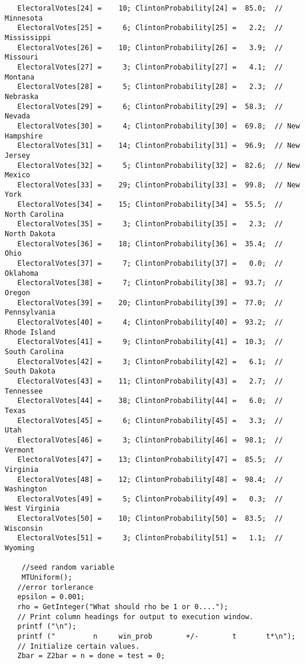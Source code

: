 \documentclass{report}
\begin{document}
\begin{lstlisting}
   ElectoralVotes[24] =    10; ClintonProbability[24] =  85.0;  // Minnesota
   ElectoralVotes[25] =     6; ClintonProbability[25] =   2.2;  // Mississippi
   ElectoralVotes[26] =    10; ClintonProbability[26] =   3.9;  // Missouri
   ElectoralVotes[27] =     3; ClintonProbability[27] =   4.1;  // Montana
   ElectoralVotes[28] =     5; ClintonProbability[28] =   2.3;  // Nebraska
   ElectoralVotes[29] =     6; ClintonProbability[29] =  58.3;  // Nevada
   ElectoralVotes[30] =     4; ClintonProbability[30] =  69.8;  // New Hampshire
   ElectoralVotes[31] =    14; ClintonProbability[31] =  96.9;  // New Jersey
   ElectoralVotes[32] =     5; ClintonProbability[32] =  82.6;  // New Mexico
   ElectoralVotes[33] =    29; ClintonProbability[33] =  99.8;  // New York
   ElectoralVotes[34] =    15; ClintonProbability[34] =  55.5;  // North Carolina
   ElectoralVotes[35] =     3; ClintonProbability[35] =   2.3;  // North Dakota
   ElectoralVotes[36] =    18; ClintonProbability[36] =  35.4;  // Ohio
   ElectoralVotes[37] =     7; ClintonProbability[37] =   0.0;  // Oklahoma
   ElectoralVotes[38] =     7; ClintonProbability[38] =  93.7;  // Oregon
   ElectoralVotes[39] =    20; ClintonProbability[39] =  77.0;  // Pennsylvania
   ElectoralVotes[40] =     4; ClintonProbability[40] =  93.2;  // Rhode Island
   ElectoralVotes[41] =     9; ClintonProbability[41] =  10.3;  // South Carolina
   ElectoralVotes[42] =     3; ClintonProbability[42] =   6.1;  // South Dakota
   ElectoralVotes[43] =    11; ClintonProbability[43] =   2.7;  // Tennessee
   ElectoralVotes[44] =    38; ClintonProbability[44] =   6.0;  // Texas
   ElectoralVotes[45] =     6; ClintonProbability[45] =   3.3;  // Utah
   ElectoralVotes[46] =     3; ClintonProbability[46] =  98.1;  // Vermont
   ElectoralVotes[47] =    13; ClintonProbability[47] =  85.5;  // Virginia
   ElectoralVotes[48] =    12; ClintonProbability[48] =  98.4;  // Washington
   ElectoralVotes[49] =     5; ClintonProbability[49] =   0.3;  // West Virginia
   ElectoralVotes[50] =    10; ClintonProbability[50] =  83.5;  // Wisconsin
   ElectoralVotes[51] =     3; ClintonProbability[51] =   1.1;  // Wyoming

    //seed random variable
    MTUniform();
   //error torlerance
   epsilon = 0.001;
   rho = GetInteger("What should rho be 1 or 0....");
   // Print column headings for output to execution window.
   printf ("\n");
   printf ("         n     win_prob        +/-        t       t*\n");
   // Initialize certain values.
   Zbar = Z2bar = n = done = test = 0;


\end{lstlisting}
\end{document}
